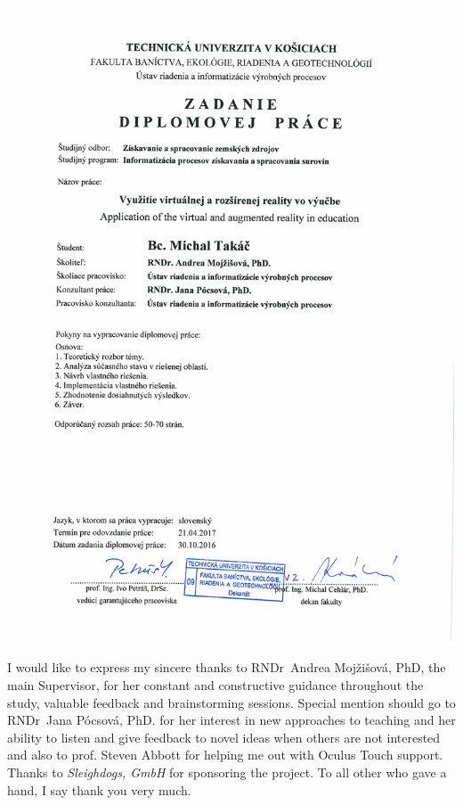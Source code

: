 \documentclass[]{tukethesis}
\begin{document}
\includegraphics[trim=3cm 0 0 5cm]{zadavaci_list.pdf}
\newpage



\declaration

\acknowledgement %
I would like to express my sincere thanks to RNDr~Andrea
Mojžišová, PhD, the main Supervisor, for her constant and constructive guidance throughout the study, valuable feedback and brainstorming sessions. Special mention should go
to RNDr~Jana Pócsová, PhD. for her interest in new approaches to teaching and her ability to listen and give feedback to novel ideas when others are not interested and also to prof. Steven Abbott for helping me out with Oculus Touch support. Thanks to \textsl{Sleighdogs, GmbH} for sponsoring the project. To all other who gave a hand, I say thank you
very much.
\endacknowledgement
\end{document}
